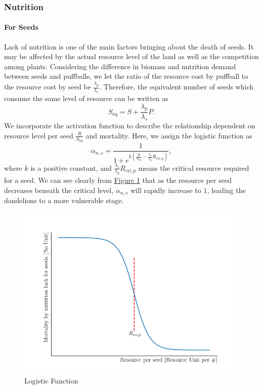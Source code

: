 \documentclass[12pt]{article}
\begin{document}
\subsubsection{Nutrition}

\paragraph{For Seeds}
Lack of nutrition is one of the main factors bringing about the death of seeds. It may be affected by the actual resource level of the land as well as the competition among plants. Considering the difference in biomass and nutrition demand between seeds and puffballs, we let the ratio of the resource cost by puffball to the resource cost by seed be 
$\frac{\lambda_p}{\lambda_s}$. Therefore, the equivalent number of seeds which consume the same level of resource can be written as
\begin{equation}
    S_{\text{eq}}=S+\frac{\lambda_p}{\lambda_s}P.
\end{equation}
We incorporate the activation function to describe the relationship dependent on resource level per seed $\frac{R}{S_{\text{eq}}}$ and mortality. Here, we assign the logistic function as 
\begin{equation}
    \alpha_{n,s}=\frac{1}{1+e^{k\left(\frac{R}{S_{\text{eq}}}-\frac{\lambda_s}{\lambda_p}R_{\text{cri},p}\right)}},
\end{equation}
where $k$ is a positive constant, and $\frac{\lambda_s}{\lambda_p}R_{\text{cri},p}$ means the critical resource required for a seed. We can see clearly from \hyperref[Nuitrition]{Figure \ref*{Nuitrition}} that as the resource per seed decreases beneath the critical level, $\alpha_{n,s}$ will rapidly increase to $1$, leading the dandelions to a more vulnerable stage.

\begin{figure}[h]
    \centering
    \includegraphics[width=0.5\linewidth]{img/nutrition.png}
    \caption{Logistic Function}
    \label{Nuitrition}
\end{figure}
\end{document}
